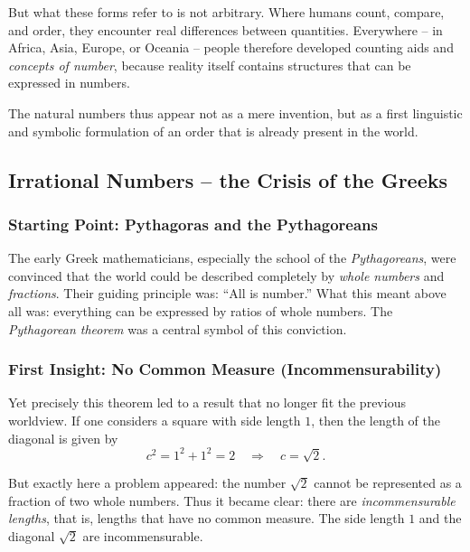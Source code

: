 But what these forms refer to is not arbitrary.
Where humans count, compare, and order,
they encounter real differences between quantities.
Everywhere -- in Africa, Asia, Europe, or Oceania --
people therefore developed counting aids and
\emph{concepts of number},
because reality itself contains structures
that can be expressed in numbers.

The natural numbers thus appear not as a mere invention,
but as a first linguistic and symbolic formulation
of an order that is already present in the world.

\newpage
\noindent

\subsection{Irrational Numbers -- the Crisis of the Greeks}
\label{sec:2.2_irrational}

\subsubsection*{Starting Point: Pythagoras and the Pythagoreans}
The early Greek mathematicians,
especially the school of the \emph{Pythagoreans},
were convinced that the world could be described completely
by \emph{whole numbers} and \emph{fractions}.
Their guiding principle was: ``All is number.''
What this meant above all was:
everything can be expressed by ratios of whole numbers.
The \emph{Pythagorean theorem}
was a central symbol of this conviction.

\subsubsection*{First Insight: No Common Measure (Incommensurability)}
Yet precisely this theorem led to a result
that no longer fit the previous worldview.
If one considers a square with side length $1$,
then the length of the diagonal is given by
\[
c^2 = 1^2 + 1^2 = 2
\quad \Rightarrow \quad
c = \sqrt{2}.
\]

But exactly here a problem appeared:
the number $\sqrt{2}$ cannot be represented as a fraction of two whole numbers.
Thus it became clear:
there are \emph{incommensurable lengths},
that is, lengths that have no common measure.
The side length $1$ and the diagonal $\sqrt{2}$ are incommensurable.

